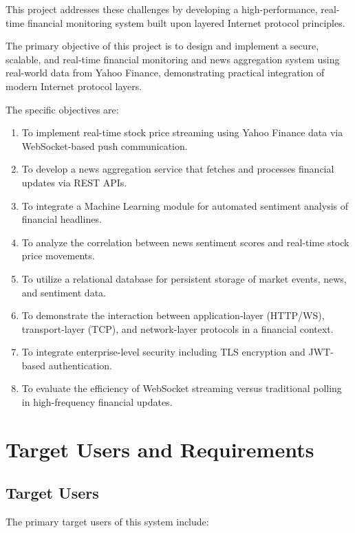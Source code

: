 This project addresses these challenges by developing a high-performance, real-time financial monitoring system built upon layered Internet protocol principles.

The primary objective of this project is to design and implement a secure, scalable, and real-time financial monitoring and news aggregation system using real-world data from Yahoo Finance, demonstrating practical integration of modern Internet protocol layers.

The specific objectives are:

\begin{enumerate}
    \item To implement real-time stock price streaming using Yahoo Finance data via WebSocket-based push communication.
    \item To develop a news aggregation service that fetches and processes financial updates via REST APIs.
    \item To integrate a Machine Learning module for automated sentiment analysis of financial headlines.
    \item To analyze the correlation between news sentiment scores and real-time stock price movements.
    \item To utilize a relational database for persistent storage of market events, news, and sentiment data.
    \item To demonstrate the interaction between application-layer (HTTP/WS), transport-layer (TCP), and network-layer protocols in a financial context.
    \item To integrate enterprise-level security including TLS encryption and JWT-based authentication.
    \item To evaluate the efficiency of WebSocket streaming versus traditional polling in high-frequency financial updates.
\end{enumerate}

\section{Target Users and Requirements}

\subsection{Target Users}
The primary target users of this system include:

